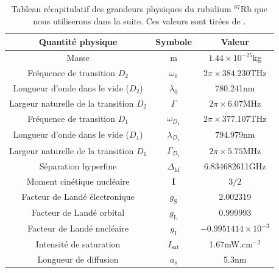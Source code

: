 \renewcommand{\arraystretch}{1.1}
\begin{table}[!ht]
\begin{center}
\begin{tabular}{ |c|c|c| }
\hline
\textbf{Quantité physique} & \textbf{Symbole} & \textbf{Valeur} \\
\hline
Masse & m & $1.44 \times 10^{-25}$kg \\
\hline
Fréquence de transition $D_2$ & $\omega_0$ & $2\pi \times 384.230$THz \\
\hline
Longueur d'onde dans le vide ($D_2$) & $\lambda_{\mathrm{0}}$ & 780.241nm \\
\hline
Largeur naturelle de la transition $D_2$ & $\Gamma$ & $2\pi \times 6.07$MHz \\
\hline
Fréquence de transition $D_1$ & $\omega_{D_1}$ & $2\pi \times 377.107$THz \\
\hline
Longueur d'onde dans le vide ($D_1$) & $\lambda_{D_1}$ & 794.979nm \\
\hline
Largeur naturelle de la transition $D_1$ & $\Gamma_{D_1}$ & $2\pi \times 5.75$MHz \\
\hline
Séparation hyperfine & $\Delta_{\mathrm{hf}}$ & 6.834682611GHz \\
\hline
Moment cinétique nucléaire & $\mathbf{I}$ & $3/2$ \\
\hline
Facteur de Landé électronique & $g_{\mathrm{S}}$ & 2.002319 \\
\hline
Facteur de Landé orbital & $g_{\mathrm{L}}$ & 0.999993\\
\hline
Facteur de Landé nucléaire & $g_{\mathrm{I}}$ & $-0.9951414 \times 10^{-3}$ \\
\hline
Intensité de saturation & $I_{\mathrm{sat}}$ & 1.67mW.cm${}^{-2}$ \\
\hline
Longueur de diffusion & $a_{\mathrm{s}}$ & 5.3nm \\
\hline
\end{tabular}%
\end{center}
\caption{Tableau récapitulatif des grandeurs physiques du rubidium ${}^{87}$Rb que nous utiliserons dans la suite. Ces valeurs sont tirées de \citep{steck2001rubidium}.}
\label{tbl:Rb87}
\end{table}


